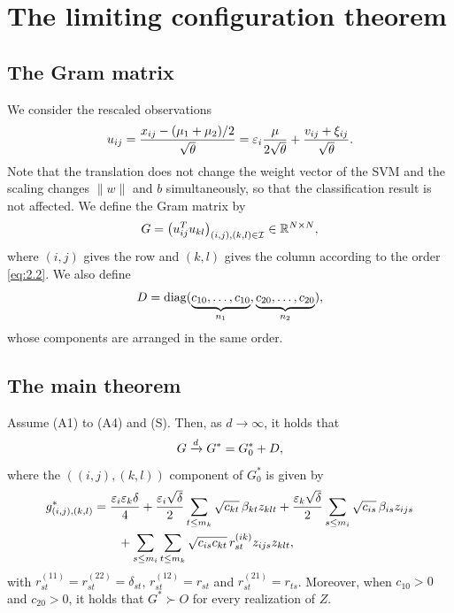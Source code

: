 \section{The limiting configuration theorem}
\label{sec:config}

\subsection{The Gram matrix}

We consider the rescaled observations
\begin{equation}
u_{ij}=\frac{x_{ij}-(\mu_1+\mu_2)/2}{\sqrt{\theta}}
=\varepsilon_i\frac{\mu}{2\sqrt{\theta}}+\frac{v_{ij}+\xi_{ij}}{\sqrt{\theta}}.
\label{eq:4.1}
\end{equation}
Note that the translation does not change the weight vector of the SVM and the
scaling changes $\|w\|$ and $b$ simultaneously, so that the classification result
is not affected. We define the Gram matrix by
\begin{equation}
G=\bigl(u_{ij}^T u_{kl}\bigr)_{(i,j),(k,l)\in\mathcal{I}}\in\mathbb{R}^{N\times N},
\label{eq:4.2}
\end{equation}
where $(i,j)$ gives the row and $(k,l)$ gives the column according to the order
\eqref{eq:2.2}. We also define
\[
D=\operatorname{diag}(\underbrace{c_{10},\dots,c_{10}}_{n_1},
\underbrace{c_{20},\dots,c_{20}}_{n_2}),
\]
whose components are arranged in the same order.

\subsection{The main theorem}

\begin{theorem}
\label{thm:1}
Assume \textup{(A1)} to \textup{(A4)} and \textup{(S)}. Then, as $d\to\infty$,
it holds that
\[
G\xrightarrow{d} G^*=G_0^*+D,
\]
where the $((i,j),(k,l))$ component of $G_0^*$ is given by
\begin{equation}
\begin{aligned}
g^*_{(i,j),(k,l)}
&=\frac{\varepsilon_i\varepsilon_k\delta}{4}
+\frac{\varepsilon_i\sqrt{\delta}}{2}\sum_{t\le m_k}\sqrt{c_{kt}}\,\beta_{kt}z_{klt}
+\frac{\varepsilon_k\sqrt{\delta}}{2}\sum_{s\le m_i}\sqrt{c_{is}}\,\beta_{is}z_{ijs}\\
&\qquad+\sum_{s\le m_i}\sum_{t\le m_k}\sqrt{c_{is}c_{kt}}\,r_{st}^{(ik)}z_{ijs}z_{klt},
\end{aligned}
\label{eq:4.3}
\end{equation}
with $r_{st}^{(11)}=r_{st}^{(22)}=\delta_{st}$, $r_{st}^{(12)}=r_{st}$ and
$r_{st}^{(21)}=r_{ts}$. Moreover, when $c_{10}>0$ and $c_{20}>0$, it holds that
$G^*\succ O$ for every realization of $Z$.
\end{theorem}

